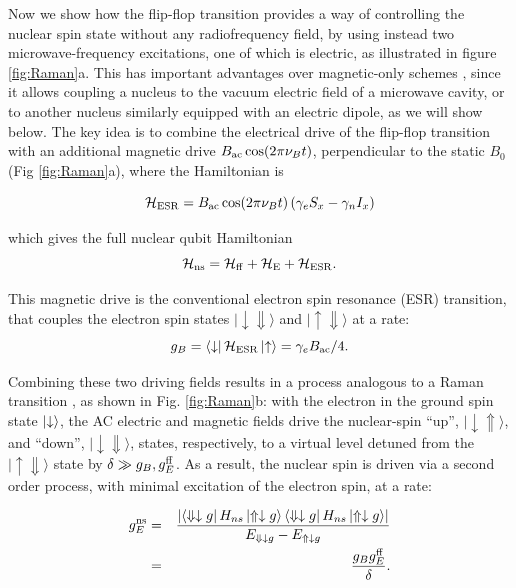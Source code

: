 Now we show how the flip-flop transition provides a way of controlling the nuclear spin state without any radiofrequency field, by using instead two microwave-frequency excitations, one of which is electric, as illustrated in figure \ref{fig:Raman}a. This has important advantages over magnetic-only schemes \cite{Morton2008,Freer2017}, since it allows coupling a nucleus to the vacuum electric field of a microwave cavity, or to another nucleus similarly equipped with an electric dipole, as we will show below. The key idea is to combine the electrical drive of the flip-flop transition with an additional magnetic drive $B_{\rm ac}\cos(2\pi\nu_Bt)$, perpendicular to the static $B_0$ (Fig \ref{fig:Raman}a), where the Hamiltonian is 

\begin{equation}
\mathcal{H}_{\rm ESR}=B_{\rm ac}\cos(2\pi\nu_Bt)\left(\gamma_e S_x-\gamma_n I_x\right)
\end{equation}

which gives the full nuclear qubit Hamiltonian
\begin{equation}
\mathcal{H}_{\rm ns}=\mathcal{H}_{\rm ff}+\mathcal{H}_{\rm E}+\mathcal{H}_{\rm ESR}.
\end{equation}

 This magnetic drive is the conventional electron spin resonance (ESR) transition, that couples the electron spin states $\lvert\downarrow\Downarrow\rangle$ and $\lvert\uparrow\Downarrow\rangle$ at a rate:
\begin{equation}
g_{B}=\bra{\downarrow}\mathcal{H}_{\rm ESR}\ket{\uparrow}= \gamma_eB_{\rm ac}/4.
\end{equation}

Combining these two driving fields results in a process analogous to a Raman transition \cite{Kok2010}, as shown in Fig. \ref{fig:Raman}b: with the electron in the ground spin state $\ket{\downarrow}$, the AC electric and magnetic fields drive the nuclear-spin ``up'', $\lvert\downarrow\Uparrow\rangle$, and ``down'', $\lvert\downarrow\Downarrow\rangle$, states, respectively, to a virtual level detuned from the $\lvert\uparrow\Downarrow\rangle$ state by $\delta\gg g_B,g_E^{\rm ff}$. As a result, the nuclear spin is driven via a second order process, with minimal excitation of the electron spin, at a rate:

\begin{eqnarray}
\label{eq:g_E^ns_simple}
g_E^{\rm ns} & = & \frac{\left|\bra{\Downarrow \downarrow g} H_{ns} \ket{\Uparrow \downarrow g} \bra{\Downarrow \downarrow g} H_{ns} \ket{\Uparrow \downarrow g} \right|}{E_{\Downarrow \downarrow g}-E_{\Uparrow \downarrow g}}\\
& = & \frac{g_B g_E^{\rm ff}}{\delta}.
\end{eqnarray} 

